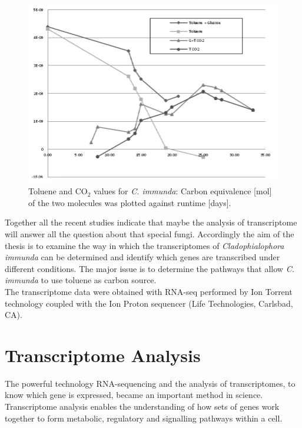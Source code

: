 \documentclass[12pt, a4paper]{report}
\begin{document}
\begin{figure}[H]
	\centering	
	\includegraphics[width=400pt]{pics/GCresults.png}
	\caption[Toluene and CO$_2$ values for \textit{C. immunda}]
	{Toluene and CO$_2$ values for \textit{C. immunda}: Carbon equivalence [mol] of the two molecules was plotted against runtime [days]. \cite{Poyntner2014}}
	\label{GCresults}
\end{figure}

Together all the recent studies indicate that maybe the analysis of transcriptome will answer all the question about that special fungi.
Accordingly the aim of the thesis is to examine the way in which the transcriptomes of \textit{Cladophialophora immunda} can be determined and identify which genes are transcribed under different conditions. The major issue is to determine the pathways that allow \textit{C. immunda} to use toluene as carbon source.\\ 
The transcriptome data were obtained with RNA-seq performed by Ion Torrent technology coupled with the Ion Proton sequencer (Life Technologies, Carlsbad, CA). \cite{BarbaraBlasi2015}

\section{Transcriptome Analysis}
The powerful technology RNA-sequencing and the analysis of transcriptomes, to know which gene is expressed, became an important method in science. Transcriptome analysis enables the understanding of how sets of genes work together to form metabolic, regulatory and signalling pathways within a cell. \cite{Xiong2006} 
\end{document}
